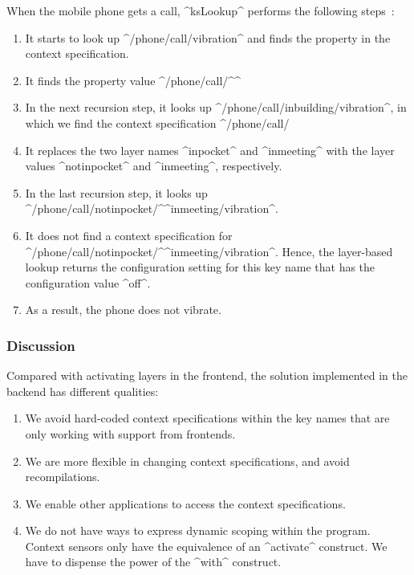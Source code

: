When the mobile phone gets a call, ^ksLookup^ performs the following steps~\cite{raab2016unanticipated}:
\begin{enumerate}
\item It starts to look up ^/phone/call/vibration^ and finds the property  in the context specification.
\item It finds the property value ^/phone/call/^\-^%
\item In the next recursion step, it looks up ^/phone/call/inbuilding/vibration^, in which we find the context specification ^/phone/call/%
\item It replaces the two layer names ^inpocket^ and ^inmeeting^ with the layer values ^notinpocket^ and ^inmeeting^, respectively.
\item In the last recursion step, it looks up ^/phone/call/notinpocket/^\linebreak^inmeeting/vibration^.
\item It does not find a context specification for ^/phone/call/notinpocket/^\linebreak^inmeeting/vibration^.
Hence, the layer-based lookup returns the configuration setting for this key name that has the configuration value ^off^.
\item As a result, the phone does not vibrate.
\end{enumerate}



\subsubsection{Discussion}

Compared with activating layers in the frontend, the solution implemented in the backend has different qualities:

\begin{enumerate}
\item We avoid hard-coded context specifications within the key names that are only working with support from frontends.
\item We are more flexible in changing context specifications, and avoid recompilations.
\item We enable other applications to access the context specifications.
\item We do not have ways to express dynamic scoping within the program.
Context sensors only have the equivalence of an ^activate^ construct.
We have to dispense the power of the ^with^ construct.
\end{enumerate}

